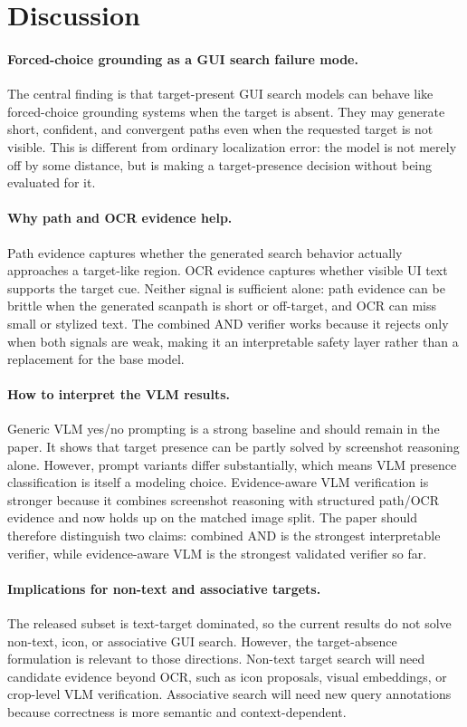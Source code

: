 \section{Discussion}

\paragraph{Forced-choice grounding as a GUI search failure mode.}
The central finding is that target-present GUI search models can behave like forced-choice grounding systems when the target is absent. They may generate short, confident, and convergent paths even when the requested target is not visible. This is different from ordinary localization error: the model is not merely off by some distance, but is making a target-presence decision without being evaluated for it.

\paragraph{Why path and OCR evidence help.}
Path evidence captures whether the generated search behavior actually approaches a target-like region. OCR evidence captures whether visible UI text supports the target cue. Neither signal is sufficient alone: path evidence can be brittle when the generated scanpath is short or off-target, and OCR can miss small or stylized text. The combined AND verifier works because it rejects only when both signals are weak, making it an interpretable safety layer rather than a replacement for the base model.

\paragraph{How to interpret the VLM results.}
Generic VLM yes/no prompting is a strong baseline and should remain in the paper. It shows that target presence can be partly solved by screenshot reasoning alone. However, prompt variants differ substantially, which means VLM presence classification is itself a modeling choice. Evidence-aware VLM verification is stronger because it combines screenshot reasoning with structured path/OCR evidence and now holds up on the matched image split. The paper should therefore distinguish two claims: combined AND is the strongest interpretable verifier, while evidence-aware VLM is the strongest validated verifier so far.

\paragraph{Implications for non-text and associative targets.}
The released subset is text-target dominated, so the current results do not solve non-text, icon, or associative GUI search. However, the target-absence formulation is relevant to those directions. Non-text target search will need candidate evidence beyond OCR, such as icon proposals, visual embeddings, or crop-level VLM verification. Associative search will need new query annotations because correctness is more semantic and context-dependent.

